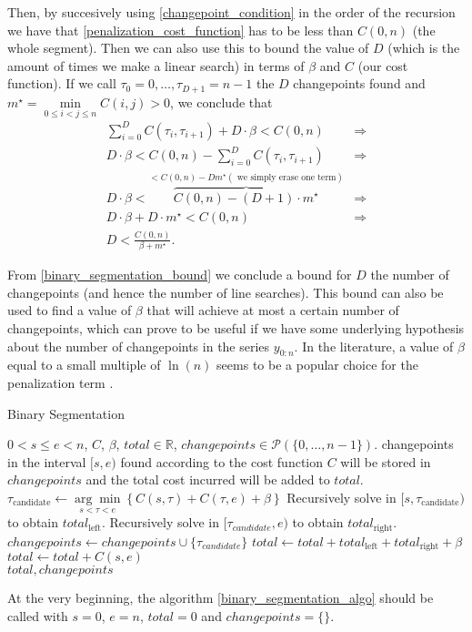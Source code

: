 \documentclass[pdflatex,sn-mathphys]{sn-jnl}%
\theoremstyle{thmstyleone}%
\theoremstyle{thmstyletwo}%
\theoremstyle{thmstylethree}%
\begin{document}
Then, by succesively using \ref{changepoint_condition} in the order of the recursion we have that  \ref{penalization_cost_function} has to be less than $C(0,n)$ (the whole segment). Then we can also use this to bound the value of $D$ (which is the amount of times we make a linear search) in terms of $\beta$ and $C$ (our cost function). If we call $\tau_0 = 0, \dots, \tau_{D+1} = n-1$ the $D$ changepoints found and $m^{\star} = \underset{0\leq i<j\leq n}{\min}C(i,j) > 0$, we conclude that
{\small 
\begin{align}
     \sum\limits_{i=0}^D C(\tau_i, \tau_{i+1}) + D\cdot \beta  < C(0,n) & \Rightarrow \nonumber \\ 
     D \cdot \beta < C(0,n) - \sum\limits_{i=0}^D C(\tau_i, \tau_{i+1}) & \Rightarrow \nonumber \\
     D\cdot \beta < \overbrace{C(0,n) - (D+1)\cdot m^{\star}}^{< C(0,n) - Dm^{\star} (\text{ we simply erase one term})} \nonumber & \Rightarrow \\ 
     D \cdot \beta + D \cdot m^{\star} < C(0,n) \nonumber & \Rightarrow \\ 
     D < \frac{C(0,n)}{\beta + m^{\star}}.
    \label{binary_segmentation_bound}
\end{align}
}

From \ref{binary_segmentation_bound} we conclude a bound for $D$ the number of changepoints (and hence the number of line searches). This bound can also be used to find a value of $\beta$ that will achieve at most a certain number of changepoints, which can prove to be useful if we have some underlying hypothesis about the number of changepoints in the series $y_{0:n}$. In the literature, a value of $\beta$ equal to a small multiple of $\ln(n)$ seems to be a popular choice for the penalization term \citep{killick}.

\begin{algorithm}[H]
\caption{Binary Segmentation}\label{binary_segmentation_algo}
\begin{algorithmic}[1]
\Require $0 < s \leq e < n$, $C$, $\beta$, $total \in \mathbb{R}$, $changepoints \in \mathcal{P}(\{0, \dots, n-1\})$. 
\Ensure changepoints in the interval $[s,e)$ found according to the cost function $C$ will be stored in $changepoints$ and the total cost incurred will be added to $total$. 
\State $\tau_{\text{candidate}} \leftarrow \underset{s < \tau < e}{\arg \min} \left \{ C(s,\tau) + C(\tau, e) + \beta \right \}$
        \State Recursively solve in  $[s, \tau_{\text{candidate}})$ to obtain $total_{\text{left}}$.
        \State Recursively solve in  $[\tau_{candidate}, e)$ to obtain $total_{\text{right}}$.
        \State $changepoints \leftarrow changepoints \cup \{ \tau_{candidate} \}$
        \State $total \leftarrow total + total_{\text{left}} + total_{\text{right}} + \beta$
\Else
        \State $total \leftarrow total + C(s,e)$
\EndIf \\
\Return $total, changepoints$
\end{algorithmic}
\end{algorithm}
At the very beginning, the algorithm \ref{binary_segmentation_algo} should be called with $s = 0$, $e = n$, $total = 0$ and $changepoints = \{ \}$.
\end{document}
